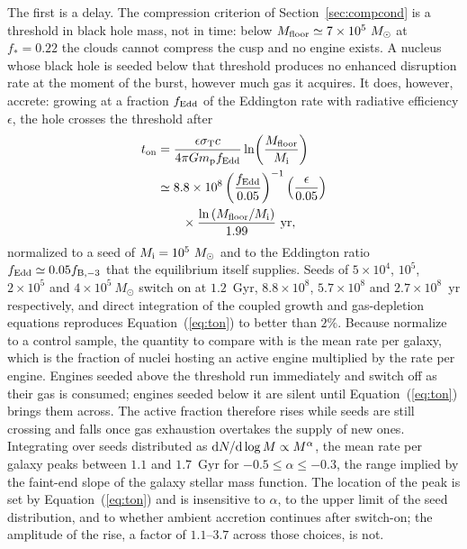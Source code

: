 \documentclass[preprint2]{aastex}
\newcommand{\msun}{M_{\odot}\xspace}
\begin{document}
The first is a delay. The compression criterion of Section~\ref{sec:compcond} is a threshold in black hole mass, not in time: below $M_{\rm floor} \simeq 7 \times 10^{5}~\msun$ at $f_{\ast} = 0.22$ the clouds cannot compress the cusp and no engine exists. A nucleus whose black hole is seeded below that threshold produces no enhanced disruption rate at the moment of the burst, however much gas it acquires. It does, however, accrete: growing at a fraction $f_{\rm Edd}$ of the Eddington rate with radiative efficiency $\epsilon$, the hole crosses the threshold after
\begin{equation}
\begin{split}
t_{\rm on} &= \frac{\epsilon \sigma_{\rm T} c}{4 \pi G m_{\rm p} f_{\rm Edd}}
   \ln\!\left(\frac{M_{\rm floor}}{M_{\rm i}}\right) \\
&\simeq 8.8 \times 10^{8} \left(\frac{f_{\rm Edd}}{0.05}\right)^{-1}
   \left(\frac{\epsilon}{0.05}\right) \\
&\quad\quad \times \frac{\ln\left(M_{\rm floor}/M_{\rm i}\right)}{1.99}~{\rm yr},
\end{split}
\label{eq:ton}
\end{equation}
normalized to a seed of $M_{\rm i} = 10^{5}~\msun$ and to the Eddington ratio $f_{\rm Edd} \simeq 0.05 f_{\rm B,-3}$ that the equilibrium itself supplies. Seeds of $5 \times 10^{4}$, $10^{5}$, $2 \times 10^{5}$ and $4 \times 10^{5}~\msun$ switch on at $1.2$~Gyr, $8.8 \times 10^{8}$, $5.7 \times 10^{8}$ and $2.7 \times 10^{8}$~yr respectively, and direct integration of the coupled growth and gas-depletion equations reproduces Equation~(\ref{eq:ton}) to better than $2\%$. Because \citet{Shepherd:2026a} normalize to a control sample, the quantity to compare with is the mean rate per galaxy, which is the fraction of nuclei hosting an active engine multiplied by the rate per engine. Engines seeded above the threshold run immediately and switch off as their gas is consumed; engines seeded below it are silent until Equation~(\ref{eq:ton}) brings them across. The active fraction therefore rises while seeds are still crossing and falls once gas exhaustion overtakes the supply of new ones. Integrating over seeds distributed as ${\rm d}N/{\rm d}\log M \propto M^{\alpha}$, the mean rate per galaxy peaks between $1.1$ and $1.7$~Gyr for $-0.5 \le \alpha \le -0.3$, the range implied by the faint-end slope of the galaxy stellar mass function. The location of the peak is set by Equation~(\ref{eq:ton}) and is insensitive to $\alpha$, to the upper limit of the seed distribution, and to whether ambient accretion continues after switch-on; the amplitude of the rise, a factor of $1.1$--$3.7$ across those choices, is not.
\end{document}
